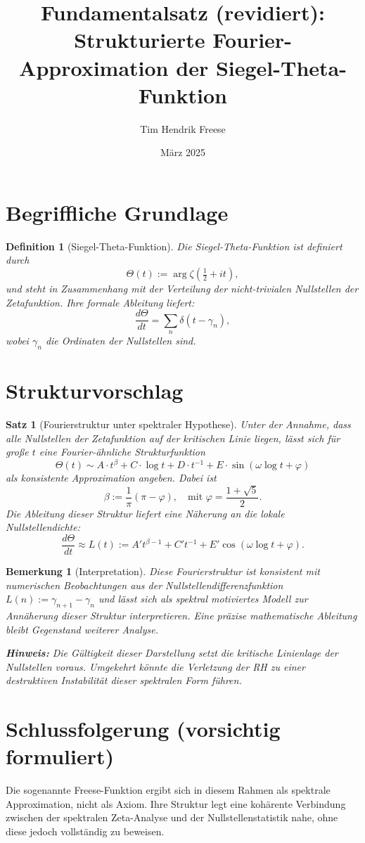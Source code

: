 \documentclass[12pt]{article}
\title{Fundamentalsatz (revidiert): Strukturierte Fourier-Approximation der Siegel-Theta-Funktion}
\author{Tim Hendrik Freese}
\date{März 2025}
\newtheorem{theorem}{Satz}
\newtheorem{definition}{Definition}
\newtheorem{remark}{Bemerkung}
\begin{document}
\maketitle

\section*{Begriffliche Grundlage}

\begin{definition}[Siegel-Theta-Funktion]
Die Siegel-Theta-Funktion ist definiert durch
\[
\Theta(t) := \arg \zeta\left( \tfrac{1}{2} + i t \right),
\]
und steht in Zusammenhang mit der Verteilung der nicht-trivialen Nullstellen der Zetafunktion. Ihre formale Ableitung liefert:
\[
\frac{d\Theta}{dt} = \sum_n \delta(t - \gamma_n),
\]
wobei \( \gamma_n \) die Ordinaten der Nullstellen sind.
\end{definition}

\section*{Strukturvorschlag}

\begin{theorem}[Fourierstruktur unter spektraler Hypothese]
Unter der Annahme, dass alle Nullstellen der Zetafunktion auf der kritischen Linie liegen, lässt sich für große \( t \) eine Fourier-ähnliche Strukturfunktion
\[
\Theta(t) \sim A \cdot t^{\beta} + C \cdot \log t + D \cdot t^{-1} + E \cdot \sin(\omega \log t + \varphi)
\]
als konsistente Approximation angeben.  
Dabei ist
\[
\beta := \frac{1}{\pi}(\pi - \varphi), \quad \text{mit } \varphi = \frac{1 + \sqrt{5}}{2}.
\]
Die Ableitung dieser Struktur liefert eine Näherung an die lokale Nullstellendichte:
\[
\frac{d\Theta}{dt} \approx L(t) := A' t^{\beta - 1} + C' t^{-1} + E' \cos(\omega \log t + \varphi).
\]
\end{theorem}

\begin{remark}[Interpretation]
Diese Fourierstruktur ist konsistent mit numerischen Beobachtungen aus der Nullstellendifferenzfunktion \( L(n) := \gamma_{n+1} - \gamma_n \)  
und lässt sich als spektral motiviertes Modell zur Annäherung dieser Struktur interpretieren.  
Eine präzise mathematische Ableitung bleibt Gegenstand weiterer Analyse.

\textbf{Hinweis:} Die Gültigkeit dieser Darstellung setzt die kritische Linienlage der Nullstellen voraus. Umgekehrt könnte die Verletzung der RH zu einer destruktiven Instabilität dieser spektralen Form führen.
\end{remark}

\section*{Schlussfolgerung (vorsichtig formuliert)}
Die sogenannte Freese-Funktion ergibt sich in diesem Rahmen als spektrale Approximation, nicht als Axiom.  
Ihre Struktur legt eine kohärente Verbindung zwischen der spektralen Zeta-Analyse und der Nullstellenstatistik nahe, ohne diese jedoch vollständig zu beweisen.
\end{document}
